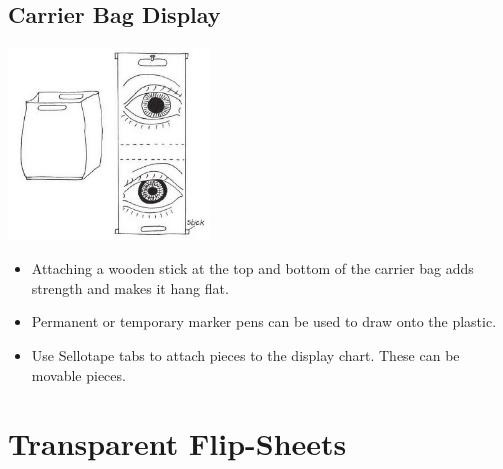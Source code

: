 \begin{multicols}{2}
\subsection{Carrier Bag Display}

\begin{center}
\includegraphics[width=0.4\textwidth]{./img/vso/carrier-bag.jpg}
\end{center}

\begin{itemize}
\item Attaching a wooden stick at the
top and bottom of the carrier
bag adds strength and makes it
hang flat.
\item Permanent or temporary marker pens can be
used to draw onto the plastic.
\item Use Sellotape tabs to attach
pieces to the display chart.
These can be movable pieces.
\end{itemize}


%


\section{Transparent Flip-Sheets}


\end{multicols}

